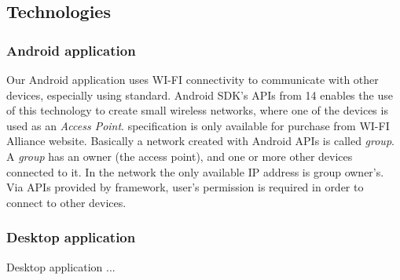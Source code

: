 \subsection{Technologies}

\subsubsection{Android application}
Our Android application uses WI-FI connectivity to communicate with other devices, especially using \direct standard. Android SDK's APIs from 14 enables the use of this technology to create small wireless networks, where one of the devices is used as an \emph{Access Point}. \direct specification is only available for purchase from WI-FI Alliance\textsuperscript{\texttrademark} website\cite{wifi_direct}.
Basically a network created with Android \direct APIs is called \emph{group}. A \emph{group} has an owner (the access point), and one or more other devices connected to it. In the network the only available IP address is group owner's. 
Via APIs provided by \direct framework, user's permission is required in order to connect to other devices.

\subsubsection{Desktop application}
Desktop application ...
